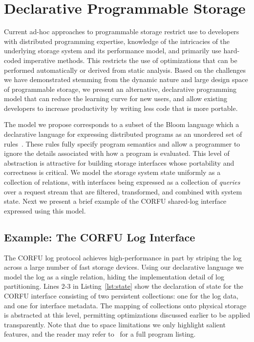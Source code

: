 \section{Declarative Programmable Storage}
\label{sec:prog-model}

Current ad-hoc approaches to programmable storage restrict use to developers
with distributed programming expertise, knowledge of the intricacies of the
underlying storage system and its performance model, and primarily use
hard-coded imperative methods. This restricts the use of optimizations that
can be performed automatically or derived from static analysis.  Based on the
challenges we have demonstrated stemming from the dynamic nature and large
design space of programmable storage, we present an alternative, declarative
programming model that can reduce the learning curve for new users, and allow
existing developers to increase productivity by writing less code that is more
portable.

The model we propose corresponds to a subset of the Bloom language which a
declarative language for expressing distributed programs as an unordered set
of rules~\cite{alvaro:cidr11}. These rules fully specify program semantics and
allow a programmer to ignore the details associated with how a program is
evaluated. This level of abstraction is attractive for building storage
interfaces whose portability and correctness is critical. We model the
storage system state uniformly as a collection of relations, with interfaces
being expressed as a collection of \emph{queries} over a request stream that
are filtered, transformed, and combined with system state. Next we present a
brief example of the CORFU shared-log interface expressed using this model.

\subsection{Example: The CORFU Log Interface}

The CORFU log protocol achieves high-performance in part by striping the log
across a large number of fast storage devices. Using our declarative language
we model the log as a single relation, hiding the implementation detail of log
partitioning. Lines 2-3 in Listing~\ref{lst:state} show the declaration of
state for the CORFU interface consisting of two persistent collections: one
for the log data, and one for interface metadata. The mapping of collections
onto physical storage is abstracted at this level, permitting optimizations
discussed earlier to be applied transparently.  Note that due to space
limitations we only highlight salient features, and the reader may refer
to~\cite{watkins:ucsc-soe-16-12} for a full program listing.

